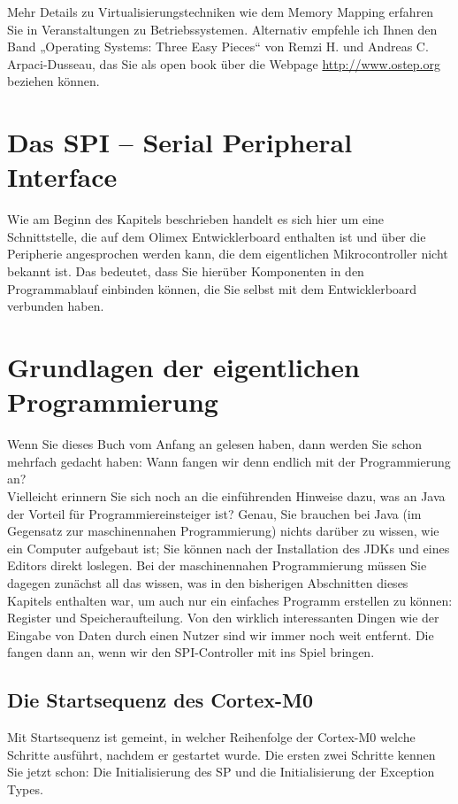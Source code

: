 Mehr Details zu Virtualisierungstechniken wie dem Memory Mapping erfahren Sie in Veranstaltungen zu Betriebssystemen. Alternativ empfehle ich Ihnen den Band „Operating Systems: Three Easy Pieces“ von Remzi H. und Andreas C. Arpaci-Dusseau, das Sie als open book über die Webpage \url{http://www.ostep.org} beziehen können.

\section{Das SPI – Serial Peripheral Interface}

Wie am Beginn des Kapitels beschrieben handelt es sich hier um eine Schnittstelle, die auf dem Olimex Entwicklerboard enthalten ist und über die Peripherie angesprochen werden kann, die dem eigentlichen Mikrocontroller nicht bekannt ist. Das bedeutet, dass Sie hierüber Komponenten in den Programmablauf einbinden können, die Sie selbst mit dem Entwicklerboard verbunden haben.

\section{Grundlagen der eigentlichen Programmierung}

Wenn Sie dieses Buch vom Anfang an gelesen haben, dann werden Sie schon mehrfach gedacht haben: Wann fangen wir denn endlich mit der Programmierung an?\\

Vielleicht erinnern Sie sich noch an die einführenden Hinweise dazu, was an Java der Vorteil für Programmiereinsteiger ist? Genau, Sie brauchen bei Java (im Gegensatz zur maschinennahen Programmierung) nichts darüber zu wissen, wie ein Computer aufgebaut ist; Sie können nach der Installation des JDKs und eines Editors direkt loslegen. Bei der maschinennahen Programmierung müssen Sie dagegen zunächst all das wissen, was in den bisherigen Abschnitten dieses Kapitels enthalten war, um auch nur ein einfaches Programm erstellen zu können: Register und Speicheraufteilung. Von den wirklich interessanten Dingen wie der Eingabe von Daten durch einen Nutzer sind wir immer noch weit entfernt. Die fangen dann an, wenn wir den SPI-Controller mit ins Spiel bringen.

\subsection{Die Startsequenz des Cortex-M0}

Mit Startsequenz ist gemeint, in welcher Reihenfolge der Cortex-M0 welche Schritte ausführt, nachdem er gestartet wurde. Die ersten zwei Schritte kennen Sie jetzt schon: Die Initialisierung des SP und die Initialisierung der Exception Types.\\

